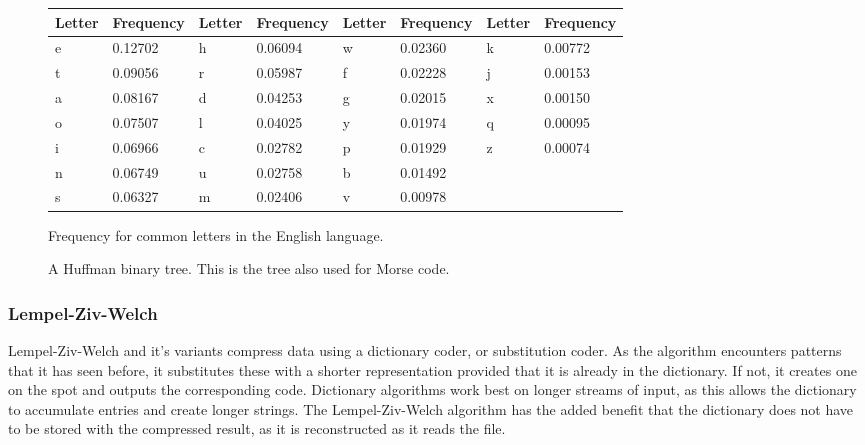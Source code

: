 \documentclass[12pt]{CPP}
\begin{document}
\renewcommand{\arraystretch}{.8}
\setlength{\tabcolsep}{6pt}
\begin{center}
\begin{figure}[!htbp]
\begin{tabular}{| l | l | l | l | l | l | l | l |}
\hline
Letter & Frequency & Letter & Frequency & Letter & Frequency & Letter & Frequency \\ \hline
e & 0.12702 & h & 0.06094 & w & 0.02360 & k & 0.00772 \\ \hline
t & 0.09056 & r & 0.05987 & f & 0.02228 & j & 0.00153 \\ \hline
a & 0.08167 & d & 0.04253 & g & 0.02015 & x & 0.00150 \\ \hline
o & 0.07507 & l & 0.04025 & y & 0.01974 & q & 0.00095 \\ \hline
i & 0.06966 & c & 0.02782 & p & 0.01929 & z & 0.00074 \\ \hline
n & 0.06749 & u & 0.02758 & b & 0.01492 &   &         \\ \hline
s & 0.06327 & m & 0.02406 & v & 0.00978 &   &         \\ \hline
\end{tabular}
\caption{Frequency for common letters in the English language.}
\end{figure}
\end{center}

\begin{figure}[!htbp]
\begin{center}
\caption{A Huffman binary tree. This is the tree also used for Morse code.}
\end{center}
\end{figure}

\subsubsection{Lempel-Ziv-Welch} Lempel-Ziv-Welch and it's variants compress data using a dictionary coder, or substitution coder. As the algorithm encounters patterns that it has seen before, it substitutes these with a shorter representation provided that it is already in the dictionary. If not, it creates one on the spot and outputs the corresponding code. Dictionary algorithms work best on longer streams of input, as this allows the dictionary to accumulate entries and create longer strings. The Lempel-Ziv-Welch algorithm has the added benefit that the dictionary does not have to be stored with the compressed result, as it is reconstructed as it reads the file. \citep{Ziv}
\end{document}
